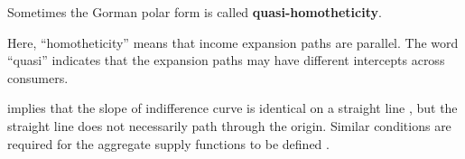 Sometimes the Gorman polar form is called \textbf{quasi-homotheticity}.

Here, ``homotheticity'' means that income expansion paths are parallel. The word ``quasi'' indicates that the expansion paths may have different intercepts across consumers.



implies that the slope of indifference curve is identical on a straight line , but the straight line does not necessarily path through the origin. Similar conditions are required for the aggregate supply functions to be defined .

